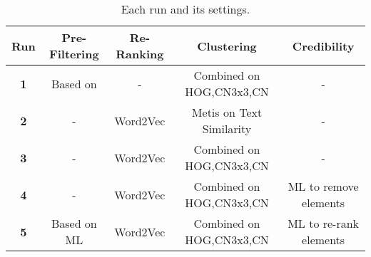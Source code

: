 
\begin{table*}[htb]
\centering
\scriptsize
\caption{Each run and its settings.}
\label{table:config}
\begin{tabular}{c|c|c|c|c}
\toprule 
\textbf{Run} & \textbf{Pre-Filtering} & \textbf{Re-Ranking} & \textbf{Clustering} & \textbf{Credibility}\tabularnewline
\midrule
\textbf{1} & Based on \cite{wsp13} & - & Combined on HOG,CN3x3,CN & -\tabularnewline
\textbf{2} & - & Word2Vec & Metis on Text Similarity & -\tabularnewline
\textbf{3} & - & Word2Vec & Combined on HOG,CN3x3,CN & -\tabularnewline
\textbf{4} & - & Word2Vec & Combined on HOG,CN3x3,CN & ML to remove elements\tabularnewline
\textbf{5} & Based on ML & Word2Vec & Combined on HOG,CN3x3,CN & ML to re-rank elements\tabularnewline
\bottomrule 
\end{tabular}
\end{table*}


